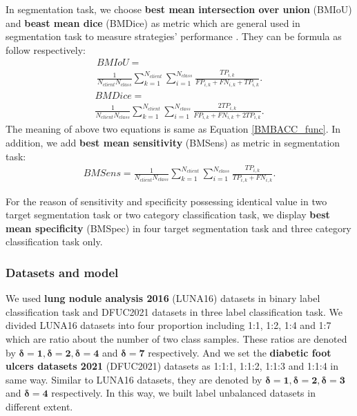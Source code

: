 \documentclass[journal]{IEEEtran}
\begin{document}
In segmentation task, we choose \textbf{best mean intersection over union} (BMIoU) and \textbf{beast mean dice} (BMDice) as metric which are general used in segmentation task to measure strategies' performance \cite{Cai2019CascadeRH}. They can be formula as follow respectively:
\begin{multline}\nonumber
	BMIoU= \\
	\frac{1}{N_{client}N_{class}} \sum_{k=1}^{N_{client}}\sum_{i=1}^{N_{class}}\frac{TP_{i,k}}{FP_{i,k}+FN_{i,k}+TP_{i,k}}.
\end{multline}
\begin{multline}\nonumber
	BMDice= \\
	\frac{1}{N_{client}N_{class}} \sum_{k=1}^{N_{client}}\sum_{i=1}^{N_{class}}\frac{2TP_{i,k}}{FP_{i,k}+FN_{i,k}+2TP_{i,k}}.
\end{multline}
The meaning of above two equations is same as Equation \ref{BMBACC_func}. In addition, we add \textbf{best mean sensitivity} (BMSens) as metric in segmentation task:
\begin{multline}\nonumber
	BMSens= 
	\frac{1}{N_{client}N_{class}} \sum_{k=1}^{N_{client}}\sum_{i=1}^{N_{class}}\frac{TP_{i,k}}{TP_{i,k}+FN_{i,k}}.
\end{multline}

For the reason of sensitivity and specificity possessing identical value in two target segmentation task or two category classification task, we display \textbf{best mean specificity} (BMSpec) in four target segmentation task and three category classification task only.


\subsubsection{\textbf{Datasets and model}}
We used \textbf{lung nodule analysis 2016} (LUNA16) datasets\cite{Yan2020UniversalLD} in binary label classification task and DFUC2021\cite{Yap2021AnalysisTC} datasets in three  label classification task. We divided LUNA16 datasets into four proportion including 1:1, 1:2, 1:4 and 1:7 which are ratio about the number of two class samples. These ratios are denoted by $\mathbf{\delta=1}, \mathbf{\delta=2}, \mathbf{\delta=4}$ and $\mathbf{\delta=7}$ respectively. And we set the \textbf{diabetic foot ulcers datasets 2021} (DFUC2021) datasets as 1:1:1, 1:1:2, 1:1:3 and 1:1:4 in same way. Similar to LUNA16 datasets, they are  denoted by $\mathbf{\delta=1}, \mathbf{\delta=2}, \mathbf{\delta=3}$ and $\mathbf{\delta=4}$ respectively. In this way, we built label unbalanced datasets in different extent.
\end{document}
